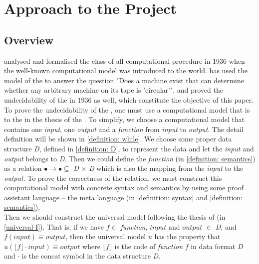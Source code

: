 \chapter{Approach to the Project}

\section{Overview}
 analysed and formalised the class of all computational procedure in 1936\cite{turing_computable_1936} when the well-known computational model  was introduced to the world.
 has used the model of the  to answer the question "Does a machine exist that can determine whether any arbitrary machine on its tape is 'circular'", and proved the undecidability of the  in 1936 as well\cite{turing_computable_1936}, which constitute the objective of this paper.\\
To prove the undecidability of the , one must use a computational model that is  to the  in the thesis of the \cite{copeland_church-turing_2002}.
To simplify, we choose a computational model that contains one \textit{input}, one \textit{output} and a \textit{function} from \textit{input} to \textit{output}.
The detail definition will be shown in \ref{definition: while}.
We choose some proper data structure \textit{D}, defined in \ref{definition: D}, to represent the data and let the \textit{input} and \textit{output} belongs to \textit{D}.
Then we could define the \textit{function} (in \ref{definition: semantics}) as a relation $\bullet \rightarrow \bullet \subseteq$ \textit{D} $\times$ \textit{D} which is also the mapping from the \textit{input} to the \textit{output}.
To prove the correctness of the relation, we must construct this computational model with concrete syntax and semantics by using some proof assistant language -- the meta language (in \ref{definition: syntax} and \ref{definition: semantics}).\\
Then we should construct the universal model following the thesis of \cite{copeland_church-turing_2002} (in \ref{universal-I}).
That is, if we have $f \in$ \textit{function}, $input$ and $output$ $\in$ \textit{D}, and $f(input) \equiv output$, then the universal model $u$ has the property that $u(\lfloor f\rfloor \cdot input) \equiv output$ where $\lfloor f\rfloor$ is the code of \textit{function} $f$ in data format \textit{D} and $\cdot$ is the concat symbol in the data structure \textit{D}.\\
